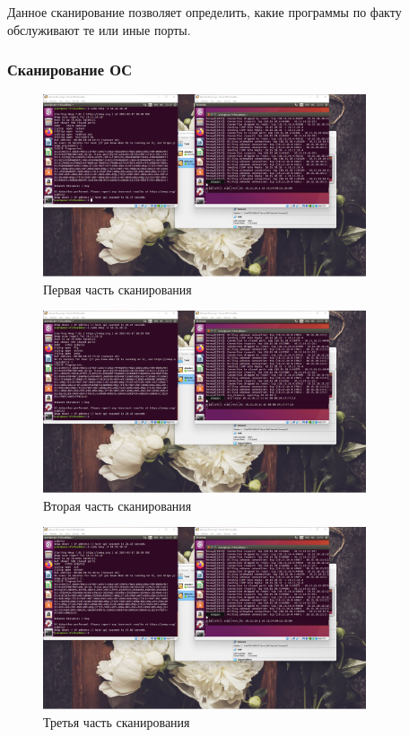 \documentclass[a4paper]{article}
\begin{document}
  Данное сканирование позволяет определить, какие программы по факту обслуживают
  те или иные порты.

  \subsubsection{Сканирование ОС}

  \begin{figure}[H]
    \centering
    \includegraphics[width=0.85\textwidth]{01_00 (33)}
    \caption{Первая часть сканирования}
  \end{figure}

  \begin{figure}[H]
    \centering
    \includegraphics[width=0.85\textwidth]{01_00 (34)}
    \caption{Вторая часть сканирования}
  \end{figure}

  \begin{figure}[H]
    \centering
    \includegraphics[width=0.85\textwidth]{01_00 (35)}
    \caption{Третья часть сканирования}
  \end{figure}
\end{document}
